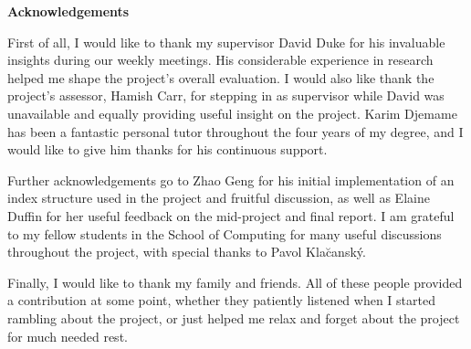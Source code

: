 \begin{center}
    {\LARGE\bf Acknowledgements}
\end{center}

First of all, I would like to thank my supervisor David Duke for his invaluable insights during our weekly meetings. His considerable experience in research helped me shape the project's overall evaluation. I would also like thank the project's assessor, Hamish Carr, for stepping in as supervisor while David was unavailable and equally providing useful insight on the project. Karim Djemame has been a fantastic personal tutor throughout the four years of my degree, and I would like to give him thanks for his continuous support.

Further acknowledgements go to Zhao Geng for his initial implementation of an index structure used in the project and fruitful discussion, as well as Elaine Duffin for her useful feedback on the mid-project and final report. I am grateful to my fellow students in the School of Computing for many useful discussions throughout the project, with special thanks to Pavol Kla\u{c}ansk\'{y}.

Finally, I would like to thank my family and friends. All of these people provided a contribution at some point, whether they patiently listened when I started rambling about the project, or just helped me relax and forget about the project for much needed rest.